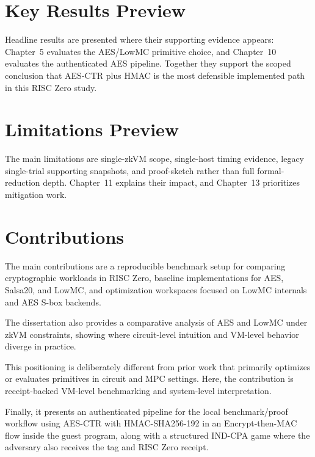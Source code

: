 \section{Key Results Preview}

Headline results are presented where their supporting evidence appears:
Chapter~5 evaluates the AES/LowMC primitive choice, and Chapter~10 evaluates the
authenticated AES pipeline. Together they support the scoped conclusion that
AES-CTR plus HMAC is the most defensible implemented path in this RISC Zero
study.

\section{Limitations Preview}

The main limitations are single-zkVM scope, single-host timing evidence,
legacy single-trial supporting snapshots, and proof-sketch rather than full
formal-reduction depth. Chapter~11 explains their impact, and Chapter~13
prioritizes mitigation work.

\section{Contributions}

The main contributions are a reproducible benchmark setup for comparing
cryptographic workloads in RISC Zero, baseline implementations for AES, Salsa20,
and LowMC, and optimization workspaces focused on LowMC internals and AES S-box
backends.

The dissertation also provides a comparative analysis of AES and LowMC under
zkVM constraints, showing where circuit-level intuition and VM-level behavior
diverge in practice.

This positioning is deliberately different from prior work that primarily
optimizes or evaluates primitives in circuit and MPC settings. Here, the
contribution is receipt-backed VM-level benchmarking and system-level
interpretation.

Finally, it presents an authenticated pipeline for the local benchmark/proof
workflow using AES-CTR with HMAC-SHA256-192 in an Encrypt-then-MAC flow inside
the guest program, along with a structured IND-CPA game where the adversary also
receives the tag and RISC Zero receipt.
